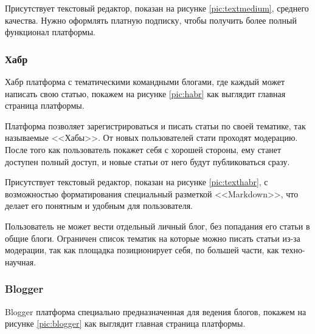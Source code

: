 
Присутствует текстовый редактор, показан на рисунке \ref{pic:textmedium}, среднего качества. Нужно оформлять платную подписку, чтобы получить более полный функционал платформы.


\subsubsection{Хабр}

Хабр платформа с тематическими командными блогами, где каждый может написать свою статью, покажем на рисунке \ref{pic:habr} как выглядит главная страница платформы.


Платформа позволяет зарегистрироваться и писать статьи по своей тематике, так называемые <<Хабы>>. От новых пользователей стати проходят модерацию. После того как пользователь покажет себя с хорошей стороны, ему станет доступен полный доступ, и новые статьи от него будут публиковаться сразу.

\pagebreak

Присутствует текстовый редактор, показан на рисунке \ref{pic:texthabr}, с возможностью форматирования специальный разметкой <<Markdown>>, что делает его понятным и удобным для пользователя.


Пользователь не может вести отдельный личный блог, без попадания его статьи в общие блоги. Ограничен список тематик на которые можно писать статьи из-за модерации, так как площадка позиционирует себя, по большей части, как техно-научная.

\pagebreak

\subsubsection{Blogger}

Blogger платформа специально предназначенная для ведения блогов, покажем на рисунке \ref{pic:blogger} как выглядит главная страница платформы.



